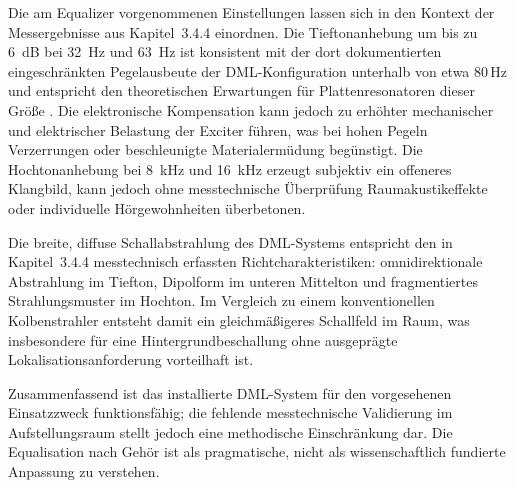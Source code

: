 Die am Equalizer vorgenommenen Einstellungen lassen sich in den Kontext der Messergebnisse aus Kapitel~3.4.4 einordnen. Die Tieftonanhebung um bis zu \SI{6}{\deci\bel} bei \SI{32}{\hertz} und \SI{63}{\hertz} ist konsistent mit der dort dokumentierten eingeschränkten Pegelausbeute der DML-Konfiguration unterhalb von etwa 80\,Hz und entspricht den theoretischen Erwartungen für Plattenresonatoren dieser Größe \cite{Harris2000}. Die elektronische Kompensation kann jedoch zu erhöhter mechanischer und elektrischer Belastung der Exciter führen, was bei hohen Pegeln Verzerrungen oder beschleunigte Materialermüdung begünstigt. Die Hochtonanhebung bei \SI{8}{\kilo\hertz} und \SI{16}{\kilo\hertz} erzeugt subjektiv ein offeneres Klangbild, kann jedoch ohne messtechnische Überprüfung Raumakustikeffekte oder individuelle Hörgewohnheiten überbetonen.

Die breite, diffuse Schallabstrahlung des DML-Systems entspricht den in Kapitel~3.4.4 messtechnisch erfassten Richtcharakteristiken: omnidirektionale Abstrahlung im Tiefton, Dipolform im unteren Mittelton und fragmentiertes Strahlungsmuster im Hochton. Im Vergleich zu einem konventionellen Kolbenstrahler entsteht damit ein gleichmäßigeres Schallfeld im Raum, was insbesondere für eine Hintergrundbeschallung ohne ausgeprägte Lokalisationsanforderung vorteilhaft ist.

Zusammenfassend ist das installierte DML-System für den vorgesehenen Einsatzzweck funktionsfähig; die fehlende messtechnische Validierung im Aufstellungsraum stellt jedoch eine methodische Einschränkung dar. Die Equalisation nach Gehör ist als pragmatische, nicht als wissenschaftlich fundierte Anpassung zu verstehen.

